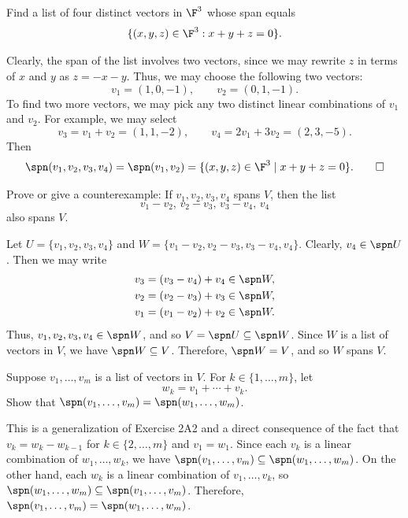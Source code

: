 
\begin{exercise}
Find a list of four distinct vectors in $\F^3$ whose span equals
\[ \{(x,y,z)\in\F^3 : x+y+z=0\}. \]
\end{exercise}
\begin{solution}
Clearly, the span of the list involves two vectors, since we may rewrite $z$ in
terms of $x$ and $y$ as $z=-x-y$. Thus, we may choose the following two
vectors:
\[ v_1=(1,0,-1), \qquad v_2=(0,1,-1). \]
To find two more vectors, we may pick any two distinct linear combinations of
$v_1$ and $v_2$. For example, we may select
\[ v_3=v_1+v_2=(1,1,-2), \qquad v_4=2v_1+3v_2=(2,3,-5). \]
Then
\[ \spn(v_1,v_2,v_3,v_4)=\spn(v_1,v_2)=\{(x,y,z)\in\F^3 \mid x+y+z=0\}.
   \qedhere \]
\end{solution}

\begin{exercise}
Prove or give a counterexample: If $v_1,v_2,v_3,v_4$ spans $V$, then the list
\[ v_1-v_2,\,v_2-v_3,\,v_3-v_4,\,v_4 \]
also spans $V$.
\end{exercise}
\begin{solution}
Let $U=\{v_1,v_2,v_3,v_4\}$ and $W=\{v_1-v_2,v_2-v_3,v_3-v_4,v_4\}$. Clearly,
$v_4\in\spn U$. Then we may write
\begin{align*}
v_3 &= (v_3-v_4)+v_4\in\spn W,\\
v_2 &= (v_2-v_3)+v_3\in\spn W,\\
v_1 &= (v_1-v_2)+v_2\in\spn W.
\end{align*}
Thus, $v_1,v_2,v_3,v_4\in\spn W$, and so $V=\spn U\subseteq\spn W$. Since $W$
is a list of vectors in $V$, we have $\spn W\subseteq V$. Therefore,
$\spn W=V$, and so $W$ spans $V$.
\end{solution}

\begin{exercise}
Suppose $v_1,\dots,v_m$ is a list of vectors in $V$. For $k\in\{1,\dots,m\}$,
let
\[ w_k = v_1+\cdots+v_k. \]
Show that $\spn(v_1,\dots,v_m)=\spn(w_1,\dots,w_m)$.
\end{exercise}
\begin{solution}
This is a generalization of Exercise 2A2 and a direct consequence of the fact
that $v_k=w_k-w_{k-1}$ for $k\in\{2,\dots,m\}$ and $v_1=w_1$. Since each $v_k$
is a linear combination of $w_1,\dots,w_k$, we have
$\spn(v_1,\dots,v_m)\subseteq\spn(w_1,\dots,w_m)$. On the other hand, each
$w_k$ is a linear combination of $v_1,\dots,v_k$, so
$\spn(w_1,\dots,w_m)\subseteq\spn(v_1,\dots,v_m)$. Therefore,
$\spn(v_1,\dots,v_m)=\spn(w_1,\dots,w_m)$.
\end{solution}

